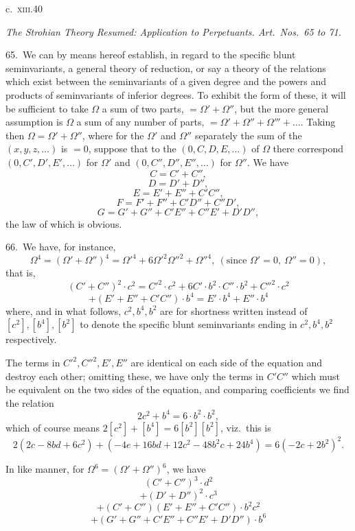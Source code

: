 \documentclass[11pt]{article}
\begin{document}
\medskip
\centerline{c.\ \textsc{xiii}.\hfill 40}

\clearpage
\begin{center}
\textit{The Strohian Theory Resumed: Application to Perpetuants. Art.\ Nos.\ 65 to 71.}
\end{center}

65.\ We can by means hereof establish, in regard to the specific blunt seminvariants, a general theory of reduction, or say a theory of the relations which exist between the seminvariants of a given degree and the powers and products of seminvariants of inferior degrees. To exhibit the form of these, it will be sufficient to take $\Omega$ a sum of two parts, $= \Omega' + \Omega''$, but the more general assumption is $\Omega$ a sum of any number of parts, $= \Omega' + \Omega'' + \Omega''' + \ldots$. Taking then $\Omega = \Omega' + \Omega''$, where for the $\Omega'$ and $\Omega''$ separately the sum of the $(x, y, z, \ldots)$ is $= 0$, suppose that to the $(0, C, D, E, \ldots)$ of $\Omega$ there correspond $(0, C', D', E', \ldots)$ for $\Omega'$ and $(0, C'', D'', E'', \ldots)$ for $\Omega''$. We have
\[
C = C' + C'',
\]
\[
D = D' + D'',
\]
\[
E = E' + E'' + C'C'',
\]
\[
F = F' + F'' + C'D'' + C''D',
\]
\[
G = G' + G'' + C'E'' + C''E' + D'D'',
\]
the law of which is obvious.

66.\ We have, for instance,
\[
\Omega^4 = (\Omega' + \Omega'')^4 = \Omega'^4 + 6\Omega'^2\Omega''^2 + \Omega''^4,\ (\text{since } \Omega' = 0,\ \Omega'' = 0),
\]
that is,
\[
(C' + C'')^2 \cdot c^2 = C'^2 \cdot c^2 + 6C' \cdot b^2 \cdot C'' \cdot b^2 + C''^2 \cdot c^2
\]
\[
+ (E' + E'' + C'C'') \cdot b^4 = E' \cdot b^4 + E'' \cdot b^4
\]
where, and in what follows, $c^2, b^4, b^2$ are for shortness written instead of $[c^2], [b^4], [b^2]$ to denote the specific blunt seminvariants ending in $c^2, b^4, b^2$ respectively.

The terms in $C'^2, C''^2, E', E''$ are identical on each side of the equation and destroy each other; omitting these, we have only the terms in $C'C''$ which must be equivalent on the two sides of the equation, and comparing coefficients we find the relation
\[
2c^2 + b^4 = 6 \cdot b^2 \cdot b^2,
\]
which of course means $2 [c^2] + [b^4] = 6 [b^2] [b^2]$, viz.\ this is
\[
2 (2c - 8bd + 6c^2) + (-4e + 16bd + 12c^2 - 48b^2c + 24b^4) = 6 (-2c + 2b^2)^2.
\]

In like manner, for $\Omega^6 = (\Omega' + \Omega'')^6$, we have
\[
(C' + C'')^3 \cdot d^2
\]
\[
+ (D' + D'')^2 \cdot c^3
\]
\[
+ (C' + C'')(E' + E'' + C'C'') \cdot b^2c^2
\]
\[
+ (G' + G'' + C'E'' + C''E' + D'D'') \cdot b^6
\]
\end{document}
